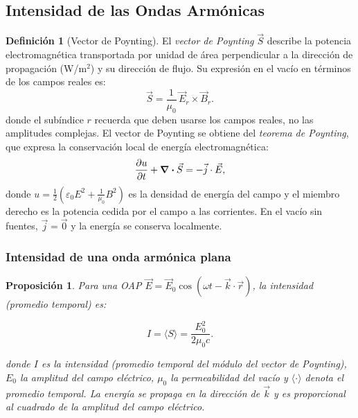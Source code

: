\documentclass[12pt, a4paper]{article}
\theoremstyle{plain}
\newtheorem{proposicion}[teorema]{Proposición}
\theoremstyle{definition}
\newtheorem{definicion}[teorema]{Definición}
\theoremstyle{remark}
\newcommand{\ve}[1]{\vec{#1}}
\begin{document}
\subsection{Intensidad de las Ondas Armónicas}

\begin{definicion}[Vector de Poynting]
El \emph{vector de Poynting} $\ve{S}$ describe la potencia electromagnética
transportada por unidad de área perpendicular a la dirección de propagación
(W/m$^2$) y su dirección de flujo. Su expresión en el vacío en términos de los
campos reales es:
\begin{equation}
  \ve{S} = \frac{1}{\mu_0}\,\ve{E}_r\times\ve{B}_r. \label{eq:poynting}
\end{equation}
donde el subíndice $r$ recuerda que deben usarse los campos reales, no las
amplitudes complejas. El vector de Poynting se obtiene del \emph{teorema de
Poynting}, que expresa la conservación local de energía electromagnética:
\[
  \pdv{u}{t} + \div\ve{S} = -\ve{j}\cdot\ve{E},
\]
donde $u = \frac{1}{2}(\varepsilon_0 E^2 + \frac{1}{\mu_0}B^2)$ es la densidad
de energía del campo y el miembro derecho es la potencia cedida por el campo
a las corrientes. En el vacío sin fuentes, $\ve{j}=\ve{0}$ y la energía se
conserva localmente.
\end{definicion}

\subsubsection{Intensidad de una onda armónica plana}

\begin{proposicion}
Para una OAP $\ve{E}=\ve{E}_0\cos(\omega t - \ve{k}\cdot\ve{r})$, la
intensidad (promedio temporal) es:
\begin{mdframed}[style=resultado]
\begin{equation}
  I = \langle S\rangle = \frac{E_0^2}{2\mu_0 c}. \label{eq:intensOAP}
\end{equation}
\end{mdframed}
donde $I$ es la intensidad (promedio temporal del módulo del vector de Poynting), $E_0$ la amplitud del campo eléctrico, $\mu_0$ la permeabilidad del vacío y $\langle\cdot\rangle$ denota el promedio temporal.
La energía se propaga en la dirección de $\ve{k}$ y es proporcional al
cuadrado de la amplitud del campo eléctrico.
\end{proposicion}
\end{document}
